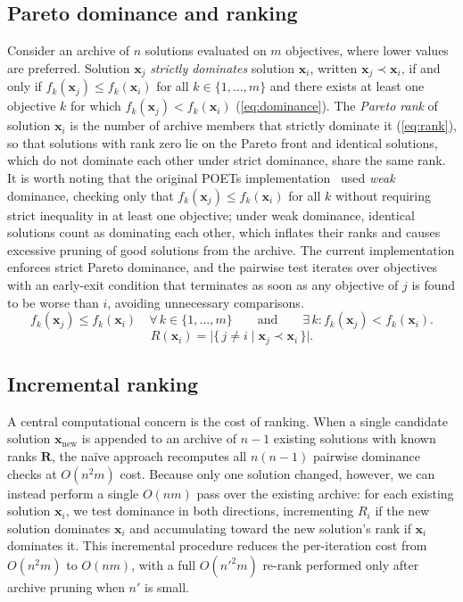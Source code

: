 \documentclass[preprint,review,12pt]{elsarticle}
\begin{document}
\subsection{Pareto dominance and ranking}\label{sec:dominance}
Consider an archive of $n$ solutions evaluated on $m$ objectives, where lower values are preferred.
Solution $\mathbf{x}_j$ \emph{strictly dominates} solution $\mathbf{x}_i$, written $\mathbf{x}_j \prec \mathbf{x}_i$, if and only if $f_k(\mathbf{x}_j) \leq f_k(\mathbf{x}_i)$ for all $k \in \{1,\ldots,m\}$ and there exists at least one objective $k$ for which $f_k(\mathbf{x}_j) < f_k(\mathbf{x}_i)$ (\cref{eq:dominance}).
The \emph{Pareto rank} of solution $\mathbf{x}_i$ is the number of archive members that strictly dominate it (\cref{eq:rank}), so that solutions with rank zero lie on the Pareto front and identical solutions, which do not dominate each other under strict dominance, share the same rank.
It is worth noting that the original POETs implementation~\cite{Song2010,Bassen2016} used \emph{weak} dominance, checking only that $f_k(\mathbf{x}_j) \leq f_k(\mathbf{x}_i)$ for all $k$ without requiring strict inequality in at least one objective; under weak dominance, identical solutions count as dominating each other, which inflates their ranks and causes excessive pruning of good solutions from the archive.
The current implementation enforces strict Pareto dominance, and the pairwise test iterates over objectives with an early-exit condition that terminates as soon as any objective of $j$ is found to be worse than $i$, avoiding unnecessary comparisons.
\begin{equation}\label{eq:dominance}
  f_k(\mathbf{x}_j) \leq f_k(\mathbf{x}_i) \quad \forall\, k \in \{1,\ldots,m\}
  \qquad\text{and}\qquad
  \exists\, k : f_k(\mathbf{x}_j) < f_k(\mathbf{x}_i).
\end{equation}
\begin{equation}\label{eq:rank}
  R(\mathbf{x}_i) = \bigl|\{\, j \neq i \mid \mathbf{x}_j \prec \mathbf{x}_i \,\}\bigr|.
\end{equation}

\subsection{Incremental ranking}\label{sec:incremental}
A central computational concern is the cost of ranking.
When a single candidate solution $\mathbf{x}_{\text{new}}$ is appended to an archive of $n-1$ existing solutions with known ranks $\mathbf{R}$, the na\"ive approach recomputes all $n(n-1)$ pairwise dominance checks at $O(n^2 m)$ cost.
Because only one solution changed, however, we can instead perform a single $O(nm)$ pass over the existing archive: for each existing solution $\mathbf{x}_i$, we test dominance in both directions, incrementing $R_i$ if the new solution dominates $\mathbf{x}_i$ and accumulating toward the new solution's rank if $\mathbf{x}_i$ dominates it.
This incremental procedure reduces the per-iteration cost from $O(n^2 m)$ to $O(nm)$, with a full $O(n'^2 m)$ re-rank performed only after archive pruning when $n'$ is small.
\end{document}
